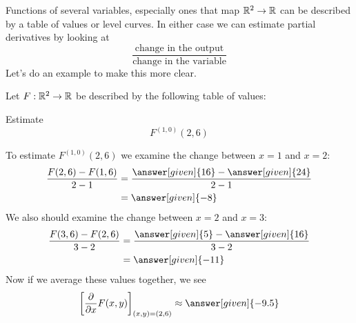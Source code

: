 \documentclass{ximera}
\begin{document}
Functions of several variables, especially ones that map $\mathbb R^2\to \mathbb R$
can be described by a table of values or level curves. In either case
we can estimate partial derivatives by looking at
\[
\frac{\text{change in the output}}{\text{change in the variable}}
\]
Let's do an example to make this more clear.
\begin{example}
  Let $F:\mathbb R^2\to\mathbb R$ be described by the following table of values:
  \begin{image}
  \end{image}
  Estimate
  \[
  F^{(1,0)}(2,6)
  \]
  \begin{explanation}
    To estimate $F^{(1,0)}(2,6)$ we examine the change between $x=1$
    and $x=2$:
    \begin{align*}
      \frac{F(2,6)-F(1,6)}{2-1}&= \frac{\answer[given]{16}-\answer[given]{24}}{2-1}\\
      &=\answer[given]{-8}
    \end{align*}
    We also should examine the change between $x=2$ and $x=3$:
    \begin{align*}
      \frac{F(3,6)-F(2,6)}{3-2}&= \frac{\answer[given]{5}-\answer[given]{16}}{3-2}\\
      &=\answer[given]{-11}
    \end{align*}
    Now if we average these values together, we see
    \[
    \eval{\pp{x} F(x,y)}_{(x,y)=(2,6)} \approx \answer[given]{-9.5}
    \]
  \end{explanation}
\end{example}
\end{document}
